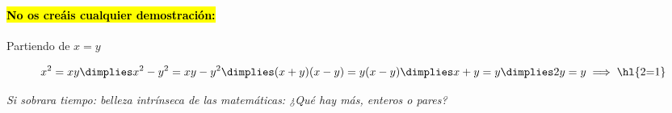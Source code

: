 \paragraph{\hl{No os creáis cualquier demostración:}}
Partiendo de $x=y$

\[
x^2 = xy \dimplies x^2-y^2 = xy-y^2 \dimplies (x+y)(x-y) = y(x-y) \dimplies x+y = y \dimplies 2y = y \implies \text{\hl{2=1}}
\]

\textit{Si sobrara tiempo: belleza intrínseca de las matemáticas: ¿Qué hay más, enteros o pares?}






